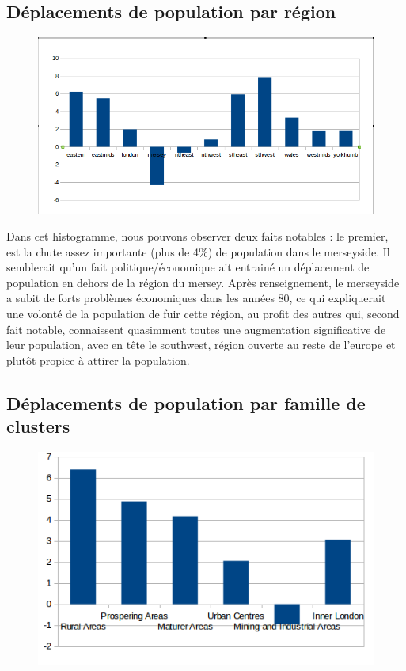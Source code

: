 \pagebreak


\subsection{Déplacements de population par région}
\begin{figure}[h!]
    \centering
    \includegraphics[width=\linewidth]{images/pop/deltaPopRegions.png}
\end{figure}

Dans cet histogramme, nous pouvons observer deux faits notables : le premier, est la chute assez importante (plus de 4\%) de population dans le merseyside. Il semblerait qu'un fait politique/économique ait entrainé un déplacement de population en dehors de la région du mersey. Après renseignement, le merseyside a subit de forts problèmes économiques dans les années 80, ce qui expliquerait une volonté de la population de fuir cette région, au profit des autres qui, second fait notable, connaissent quasimment toutes une augmentation significative de leur population, avec en tête le southwest, région ouverte au reste de l'europe et plutôt propice à attirer la population.



\pagebreak


\subsection{Déplacements de population par famille de clusters}

\begin{figure}[h!]
    \centering
    \includegraphics[width=\linewidth]{images/pop/deltaPopFamilleCluster.png}
\end{figure}

